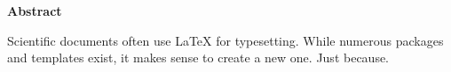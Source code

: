 
\cleardoublepage\thispagestyle{plain}

\textbf{\Large Abstract}

Scientific documents often use \LaTeX{} for typesetting. While numerous
packages and templates exist, it makes sense to create a new one. Just
because.
